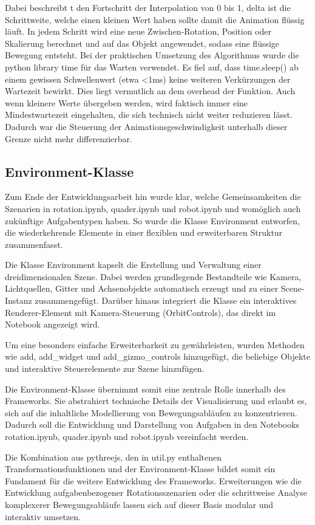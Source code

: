 Dabei beschreibt t den Fortschritt der Interpolation von 0 bis 1, delta ist die Schrittweite, welche einen kleinen Wert haben sollte damit die Animation flüssig läuft.
In jedem Schritt wird eine neue Zwischen-Rotation, Position oder Skalierung berechnet und auf das Objekt angewendet, sodass eine flüssige Bewegung entsteht.
Bei der praktischen Umsetzung des Algorithmus wurde die python library time für das Warten verwendet. Es fiel auf,
dass time.sleep() ab einem gewissen Schwellenwert (etwa <1ms) keine weiteren Verkürzungen der Wartezeit bewirkt.
Dies liegt vermutlich an dem overhead der Funktion. Auch wenn kleinere Werte übergeben werden,
wird faktisch immer eine Mindestwartezeit eingehalten, die sich technisch nicht weiter reduzieren lässt.
Dadurch war die Steuerung der Animationsgeschwindigkeit unterhalb dieser Grenze nicht mehr differenzierbar.

\subsection{Environment-Klasse}
Zum Ende der Entwicklungsarbeit hin wurde klar, welche Gemeinsamkeiten die Szenarien in rotation.ipynb, quader.ipynb und robot.ipynb und womöglich auch zukünftige Aufgabentypen haben.
So wurde die Klasse Environment entworfen, die wiederkehrende Elemente in einer flexiblen und erweiterbaren Struktur zusammenfasst.

Die Klasse Environment kapselt die Erstellung und Verwaltung einer dreidimensionalen Szene.
Dabei werden grundlegende Bestandteile wie Kamera, Lichtquellen, Gitter und Achsenobjekte automatisch erzeugt und zu einer Scene-Instanz zusammengefügt.
Darüber hinaus integriert die Klasse ein interaktives Renderer-Element mit Kamera-Steuerung (OrbitControls),
das direkt im Notebook angezeigt wird.

Um eine besonders einfache Erweiterbarkeit zu gewährleisten, wurden Methoden wie add, add\_widget und add\_gizmo\_controls hinzugefügt,
die beliebige Objekte und interaktive Steuerelemente zur Szene hinzufügen.

Die Environment-Klasse übernimmt somit eine zentrale Rolle innerhalb des Frameworks.
Sie abstrahiert technische Details der Visualisierung und erlaubt es, sich auf die inhaltliche Modellierung von Bewegungsabläufen zu konzentrieren.
Dadurch soll die Entwicklung und Darstellung von Aufgaben in den Notebooks rotation.ipynb, quader.ipynb und robot.ipynb vereinfacht werden.

Die Kombination aus pythreejs, den in util.py enthaltenen Transformationsfunktionen und der Environment-Klasse bildet
somit ein Fundament für die weitere Entwicklung des Frameworks.
Erweiterungen wie die Entwicklung aufgabenbezogener Rotationsszenarien oder die schrittweise Analyse
komplexerer Bewegungsabläufe lassen sich auf dieser Basis modular und interaktiv umsetzen.



